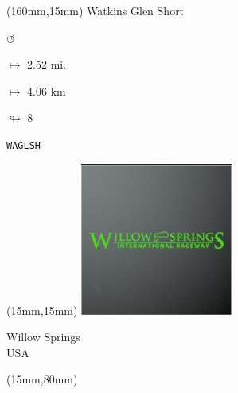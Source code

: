 \begin{textblock*}{40mm}(160mm,15mm)%
Watkins Glen Short
\par \Huge$\circlearrowleft$
\Large
\par$\mapsto$ 2.52 mi.
\par$\mapsto$ 4.06 km
\par$\looparrowright$ 8
\par\hfill\tiny\tt WAGLSH\\
\end{textblock*}
\null\newpage

\begin{textblock*}{50mm}(15mm,15mm)%
\includegraphics[width=50mm]{LG/2015-05-20_00098.png}
\par Willow Springs\\ USA
\end{textblock*}
\begin{textblock*}{185mm}(15mm,80mm)%
\end{textblock*}
